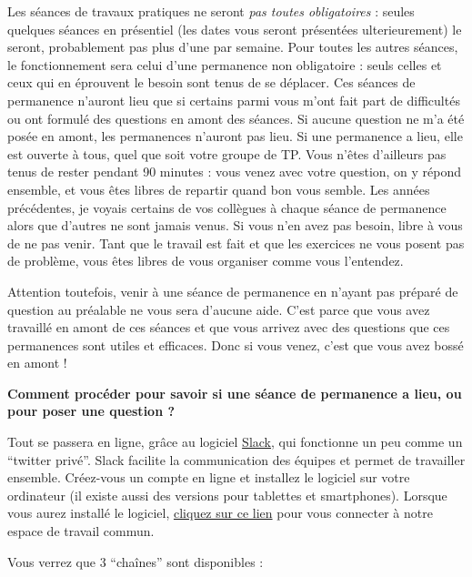 \documentclass[
  a4paper,
]{article}
\begin{document}
Les séances de travaux pratiques ne seront \emph{pas toutes obligatoires} : seules quelques séances en présentiel (les dates vous seront présentées ulterieurement) le seront, probablement pas plus d'une par semaine. Pour toutes les autres séances, le fonctionnement sera celui d'une permanence non obligatoire : seuls celles et ceux qui en éprouvent le besoin sont tenus de se déplacer. Ces séances de permanence n'auront lieu que si certains parmi vous m'ont fait part de difficultés ou ont formulé des questions en amont des séances. Si aucune question ne m'a été posée en amont, les permanences n'auront pas lieu. Si une permanence a lieu, elle est ouverte à tous, quel que soit votre groupe de TP. Vous n'êtes d'ailleurs pas tenus de rester pendant 90 minutes : vous venez avec votre question, on y répond ensemble, et vous êtes libres de repartir quand bon vous semble. Les années précédentes, je voyais certains de vos collègues à chaque séance de permanence alors que d'autres ne sont jamais venus. Si vous n'en avez pas besoin, libre à vous de ne pas venir. Tant que le travail est fait et que les exercices ne vous posent pas de problème, vous êtes libres de vous organiser comme vous l'entendez.

Attention toutefois, venir à une séance de permanence en n'ayant pas préparé de question au préalable ne vous sera d'aucune aide. C'est parce que vous avez travaillé en amont de ces séances et que vous arrivez avec des questions que ces permanences sont utiles et efficaces. Donc si vous venez, c'est que vous avez bossé en amont !

\textbf{Comment procéder pour savoir si une séance de permanence a lieu, ou pour poser une question ?}

Tout se passera en ligne, grâce au logiciel \href{https://slack.com/intl/fr-fr/}{Slack}, qui fonctionne un peu comme un ``twitter privé''. Slack facilite la communication des équipes et permet de travailler ensemble. Créez-vous un compte en ligne et installez le logiciel sur votre ordinateur (il existe aussi des versions pour tablettes et smartphones). Lorsque vous aurez installé le logiciel, \href{https://join.slack.com/t/univlrgroupe/shared_invite/zt-grop8wl2-xxV0PNg8DFpVUYmmdk0WAA}{cliquez sur ce lien} pour vous connecter à notre espace de travail commun.

Vous verrez que 3 ``chaînes'' sont disponibles :
\end{document}
